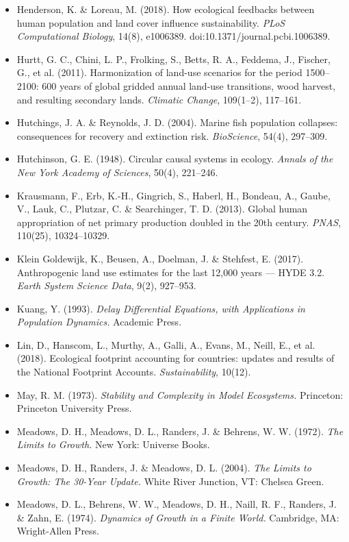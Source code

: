\documentclass[11pt]{article}
\begin{document}
\begin{itemize}
\item Henderson, K. \& Loreau, M. (2018). How ecological feedbacks between human population and land cover influence sustainability. \emph{PLoS Computational Biology}, 14(8), e1006389. doi:10.1371/journal.pcbi.1006389.
\item Hurtt, G. C., Chini, L. P., Frolking, S., Betts, R. A., Feddema, J., Fischer, G., et al. (2011). Harmonization of land-use scenarios for the period 1500--2100: 600 years of global gridded annual land-use transitions, wood harvest, and resulting secondary lands. \emph{Climatic Change}, 109(1--2), 117--161.
\item Hutchings, J. A. \& Reynolds, J. D. (2004). Marine fish population collapses: consequences for recovery and extinction risk. \emph{BioScience}, 54(4), 297--309.
\item Hutchinson, G. E. (1948). Circular causal systems in ecology. \emph{Annals of the New York Academy of Sciences}, 50(4), 221--246.
\item Krausmann, F., Erb, K.-H., Gingrich, S., Haberl, H., Bondeau, A., Gaube, V., Lauk, C., Plutzar, C. \& Searchinger, T. D. (2013). Global human appropriation of net primary production doubled in the 20th century. \emph{PNAS}, 110(25), 10324--10329.
\item Klein Goldewijk, K., Beusen, A., Doelman, J. \& Stehfest, E. (2017). Anthropogenic land use estimates for the last 12,000 years --- HYDE 3.2. \emph{Earth System Science Data}, 9(2), 927--953.
\item Kuang, Y. (1993). \emph{Delay Differential Equations, with Applications in Population Dynamics.} Academic Press.
\item Lin, D., Hanscom, L., Murthy, A., Galli, A., Evans, M., Neill, E., et al. (2018). Ecological footprint accounting for countries: updates and results of the National Footprint Accounts. \emph{Sustainability}, 10(12).
\item May, R. M. (1973). \emph{Stability and Complexity in Model Ecosystems.} Princeton: Princeton University Press.
\item Meadows, D. H., Meadows, D. L., Randers, J. \& Behrens, W. W. (1972). \emph{The Limits to Growth.} New York: Universe Books.
\item Meadows, D. H., Randers, J. \& Meadows, D. L. (2004). \emph{The Limits to Growth: The 30-Year Update.} White River Junction, VT: Chelsea Green.
\item Meadows, D. L., Behrens, W. W., Meadows, D. H., Naill, R. F., Randers, J. \& Zahn, E. (1974). \emph{Dynamics of Growth in a Finite World.} Cambridge, MA: Wright-Allen Press.

\end{itemize}
\end{document}
